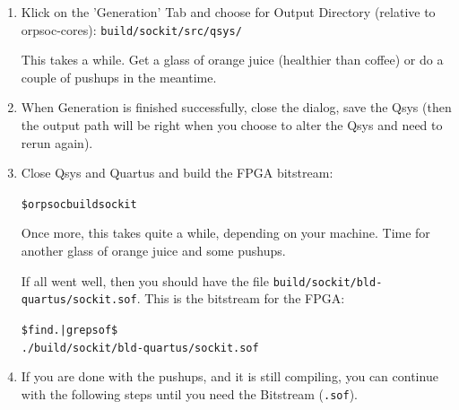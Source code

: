 \documentclass[twoside]{article}
\begin{document}
\begin{enumerate}
\item Klick on the 'Generation' Tab and choose for Output Directory
  (relative to orpsoc-cores): \texttt{build/sockit/src/qsys/}

  This takes a while. Get a glass of orange juice (healthier than
  coffee) or do a couple of pushups in the meantime.

\item When Generation is finished successfully, close the dialog, save
  the Qsys (then the output path will be right when you choose to
  alter the Qsys and need to rerun again).

\item Close Qsys and Quartus and
  build the FPGA bitstream:
  \begin{alltt}
\$ orpsoc build sockit    
  \end{alltt}

  Once more, this takes quite a while, depending on your machine. Time
  for another glass of orange juice and some pushups.

  If all went well, then you should have the file
  \texttt{build/sockit/bld-quartus/sockit.sof}. This is the bitstream
  for the FPGA:
  \begin{alltt}
\$ find . | grep sof\$
./build/sockit/bld-quartus/sockit.sof    
  \end{alltt}

\item If you are done with the pushups, and it is still compiling, you
  can continue with the following steps until you need the Bitstream
  (\texttt{.sof}).
\end{enumerate}
\end{document}
